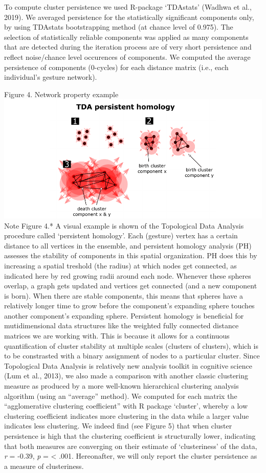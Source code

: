 \documentclass[
  man, noextraspace,floatsintext]{apa6}
\begin{document}
To compute cluster persistence we used R-package `TDAstats' (Wadhwa et al., 2019). We averaged persistence for the statistically significant components only, by using TDAstats bootstrapping method (at chance level of 0.975). The selection of statistically reliable components was applied as many components that are detected during the iteration process are of very short persistence and reflect noise/chance level occurences of components. We computed the average persistence of components (0-cycles) for each distance matrix (i.e., each individual's gesture network).

Figure 4. Network property example\\
\includegraphics{GNet_WP_files/figure-latex/networkprop_plot-1.pdf}
\small *Note Figure 4.* A visual example is shown of the Topological Data Analysis procedure called `persistent homology'. Each (gesture) vertex has a certain distance to all vertices in the ensemble, and persistent homology analysis (PH) assesses the stability of components in this spatial organization. PH does this by increasing a spatial treshold (the radius) at which nodes get connected, as indicated here by red growing radii around each node. Whenever these spheres overlap, a graph gets updated and vertices get connected (and a new component is born). When there are stable components, this means that spheres have a relatively longer time to grow before the component's expanding sphere touches another component's expanding sphere.\normalsize    
Persistent homology is beneficial for mutidimensional data structures like the weighted fully connected distance matrices we are working with. This is because it allows for a continuous quantification of cluster stability at multiple scales (clusters of clusters), which is to be constrasted with a binary assignment of nodes to a particular cluster. Since Topological Data Analysis is relatively new analysis toolkit in cognitive science (Lum et al., 2013), we also made a comparison with another classic clustering measure as produced by a more well-known hierarchical clustering analysis algorithm (using an ``average'' method). We computed for each matrix the ``agglomerative clustering coefficient'' with R package `cluster', whereby a low clustering coefficient indicates more clustering in the data while a larger value indicates less clustering. We indeed find (see Figure 5) that when cluster persistence is high that the clustering coefficient is structurally lower, indicating that both measures are converging on their estimate of `clusteriness' of the data, \emph{r} = -0.39, \emph{p} = \textless{} .001. Hereonafter, we will only report the cluster persistence as a measure of clusteriness.
\end{document}
